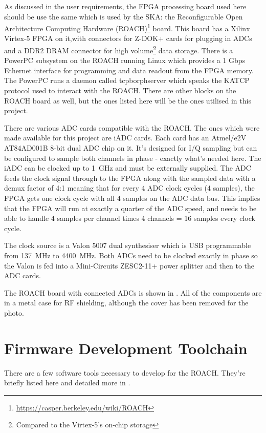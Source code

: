 As discussed in the user requirements, the FPGA processing board used here should be use the same which is used by the SKA: the Reconfigurable Open Architecture Computing Hardware (ROACH)\footnote{\url{https://casper.berkeley.edu/wiki/ROACH}} board. This board has a Xilinx Virtex-5 FPGA on it,with connectors for Z-DOK+ cards for plugging in ADCs and a DDR2 DRAM connector for high volume\footnote{Compared to the Virtex-5's on-chip storage} data storage. There is a PowerPC subsystem on the ROACH running Linux which provides a 1 Gbps Ethernet interface for programming and data readout from the FPGA memory. The PowerPC runs a daemon called tcpborphserver which speaks the KATCP protocol used to interact with the ROACH. There are other blocks on the ROACH board as well, but the ones listed here will be the ones utilised in this project.

There are various ADC cards compatible with the ROACH. The ones which were made available for this project are iADC cards. Each card has an Atmel/e2V AT84AD001B 8-bit dual ADC chip on it. It's designed for I/Q sampling but can be configured to sample both channels in phase - exactly what's needed here. The iADC can be clocked up to \SI{1}{\giga\hertz} and must be externally supplied. The ADC feeds the clock signal through to the FPGA along with the sampled data with a demux factor of 4:1 meaning that for every 4 ADC clock cycles (4 samples), the FPGA gets one clock cycle with all 4 samples on the ADC data bus. This implies that the FPGA will run at exactly a quarter of the ADC speed, and needs to be able to handle 4 samples per channel times 4 channels = 16 samples every clock cycle.

The clock source is a Valon 5007 dual synthesiser which is USB programmable from \SI{137}{\mega\hertz} to \SI{4400}{\mega\hertz}. Both ADCs need to be clocked exactly in phase so the Valon is fed into a Mini-Circuits ZESC2-11+ power splitter and then to the ADC cards.

The ROACH board with connected ADCs is shown in . All of the components are in a metal case for RF shielding, although the cover has been removed for the photo.


\section{Firmware Development Toolchain}
There are a few software tools necessary to develop for the ROACH. They're briefly listed here and detailed more in .\\

